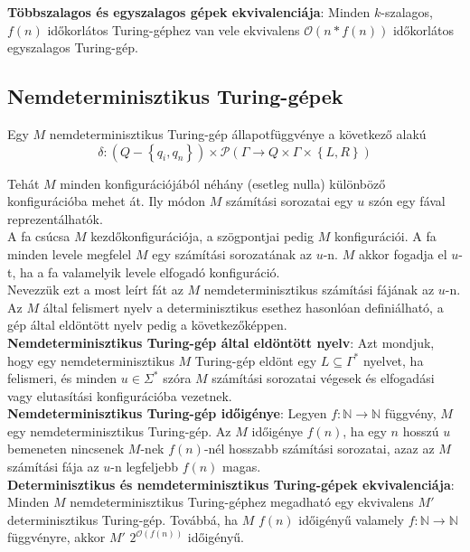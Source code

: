\documentclass[tikz,12pt,margin=0px]{article}
\begin{document}
	\noindent \textbf{Többszalagos és egyszalagos gépek ekvivalenciája}: Minden $k$-szalagos, $f(n)$ időkorlátos Turing-géphez
	van vele ekvivalens $\mathcal{O}(n*f(n))$ időkorlátos egyszalagos Turing-gép.
	
	\subsection*{Nemdeterminisztikus Turing-gépek}
	
	Egy $M$ nemdeterminisztikus Turing-gép állapotfüggvénye a következő alakú
    \[
	   \delta : (Q - \left\{q_{i},q_{n}\right\}) \times \mathcal{P}(\Gamma \to Q \times \Gamma \times \left\{L, R\right\})
    \]
	
    \noindent Tehát $M$ minden konfigurációjából néhány (esetleg nulla) különböző konfigurációba mehet át. Ily módon $M$ számítási sorozatai egy $u$ szón egy fával reprezentálhatók.\\

    \noindent  A fa csúcsa $M$ kezdőkonfigurációja, a szögpontjai pedig	$M$ konfigurációi. A fa minden levele megfelel $M$ egy számítási sorozatának az $u$-n. $M$ akkor fogadja el $u$-t, ha a fa valamelyik levele elfogadó konfiguráció.\\

    \noindent Nevezzük ezt a most leírt fát az $M$ nemdeterminisztikus számítási fájának az $u$-n. Az $M$ által felismert nyelv a determinisztikus esethez hasonlóan definiálható, a gép által eldöntött nyelv pedig a következőképpen.\\
	
    \noindent \textbf{Nemdeterminisztikus Turing-gép által eldöntött nyelv}: Azt mondjuk, hogy egy nemdeterminisztikus $M$ Turing-gép eldönt egy $L \subseteq \Gamma^{*}$ nyelvet, ha felismeri, és minden $u \in \Sigma^{*}$ szóra $M$ számítási sorozatai végesek és elfogadási vagy elutasítási konfigurációba vezetnek.\\

    \noindent \textbf{Nemdeterminisztikus Turing-gép időigénye}: Legyen $f : \mathbb{N} \to \mathbb{N}$ függvény, $M$ egy nemdeterminisztikus Turing-gép. Az $M$ időigénye $f(n)$, ha egy $n$ hosszú $u$ bemeneten nincsenek $M$-nek $f(n)$-nél hosszabb számítási sorozatai, azaz az $M$ számítási fája az $u$-n legfeljebb $f(n)$ magas.\\
	
	\noindent \textbf{Determinisztikus és nemdeterminisztikus Turing-gépek ekvivalenciája}:
    Minden $M$ nemdeterminisztikus Turing-géphez megadható egy ekvivalens $M'$ determinisztikus Turing-gép. Továbbá, ha $M$ $f(n)$ időigényű valamely $f : \mathbb{N} \to \mathbb{N}$ függvényre, akkor $M'$ $2^{\mathcal{O}(f(n))}$ időigényű.
	
\end{document}
